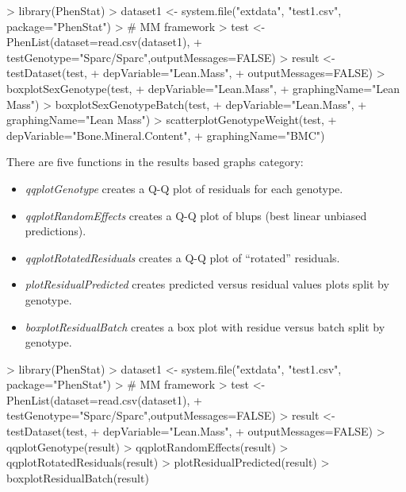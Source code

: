 \documentclass[a4paper]{article}
\begin{document}
\begin{Schunk}
\begin{Sinput}
> library(PhenStat)
> dataset1 <- system.file("extdata", "test1.csv", package="PhenStat")
> # MM framework
> test <- PhenList(dataset=read.csv(dataset1),
+         testGenotype="Sparc/Sparc",outputMessages=FALSE)
> result <- testDataset(test,
+         depVariable="Lean.Mass",
+         outputMessages=FALSE)
> boxplotSexGenotype(test,
+         depVariable="Lean.Mass",
+         graphingName="Lean Mass")
> boxplotSexGenotypeBatch(test,
+         depVariable="Lean.Mass",
+         graphingName="Lean Mass")
> scatterplotGenotypeWeight(test,
+         depVariable="Bone.Mineral.Content",
+         graphingName="BMC")
\end{Sinput}
\end{Schunk}

There are five functions in the results based graphs category:
\begin{itemize}
\item \textit{qqplotGenotype} creates a Q-Q plot of residuals for each genotype.
\item \textit{qqplotRandomEffects} creates a Q-Q plot of blups (best linear unbiased predictions).
\item \textit{qqplotRotatedResiduals} creates a Q-Q plot of ``rotated'' residuals.
\item \textit{plotResidualPredicted} creates predicted versus residual values plots split by genotype.
\item \textit{boxplotResidualBatch} creates a box plot with residue versus batch split by genotype.
\end{itemize}

\begin{Schunk}
\begin{Sinput}
> library(PhenStat)
> dataset1 <- system.file("extdata", "test1.csv", package="PhenStat")
> # MM framework
> test <- PhenList(dataset=read.csv(dataset1),
+         testGenotype="Sparc/Sparc",outputMessages=FALSE)
> result <- testDataset(test,
+         depVariable="Lean.Mass",
+         outputMessages=FALSE)
> qqplotGenotype(result)
> qqplotRandomEffects(result)
> qqplotRotatedResiduals(result)
> plotResidualPredicted(result)
> boxplotResidualBatch(result)
\end{Sinput}
\end{Schunk}
\end{document}
